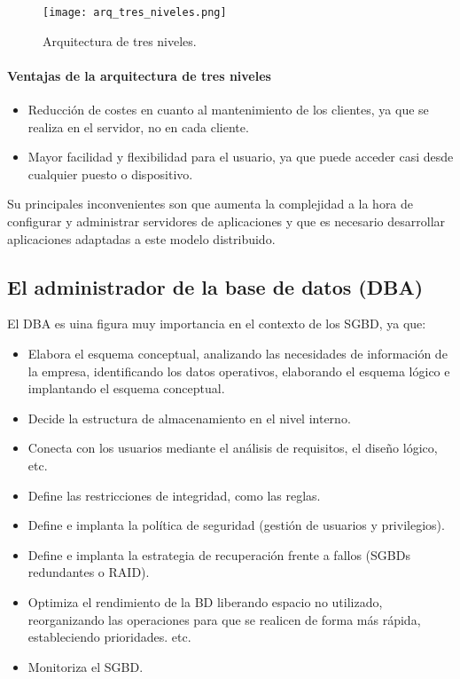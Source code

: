 \documentclass[12pt,spanish]{article}
\numberwithin{definition}{subsection}
\begin{document}
\begin{figure}[H]
\centering
\texttt{[image: arq\_tres\_niveles.png]}
\caption{Arquitectura de tres niveles.}
\end{figure}

\paragraph{Ventajas de la arquitectura de tres niveles}

\begin{itemize}
	\item Reducción de costes en cuanto al mantenimiento de los clientes, ya que se realiza en el servidor, no en cada cliente.
	\item Mayor facilidad y flexibilidad para el usuario, ya que puede acceder casi desde cualquier puesto o dispositivo.
\end{itemize}

Su principales inconvenientes son que aumenta la complejidad a la hora de configurar y administrar servidores de aplicaciones y que es necesario desarrollar aplicaciones adaptadas a este modelo distribuido.
\newpage
\subsection{El administrador de la base de datos (DBA)}

El DBA es uina figura muy importancia en el contexto de los SGBD, ya que:
\begin{itemize}
	\item Elabora el esquema conceptual, analizando las necesidades de información de la empresa, identificando los datos operativos, elaborando el esquema lógico e implantando el esquema conceptual.
	\item Decide la estructura de almacenamiento en el nivel interno.
	\item Conecta con los usuarios mediante el análisis de requisitos, el diseño lógico, etc.
	\item Define las restricciones de integridad, como las reglas.
	\item Define e implanta la política de seguridad (gestión de usuarios y privilegios).
	\item Define e implanta la estrategia de recuperación frente a fallos (SGBDs redundantes o RAID).
	\item Optimiza el rendimiento de la BD liberando espacio no utilizado, reorganizando las operaciones para que se realicen de forma más rápida,  estableciendo prioridades. etc.
	\item Monitoriza el SGBD.
	
\end{itemize}
\end{document}
